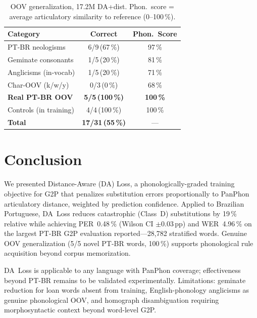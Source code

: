 \documentclass[conference]{IEEEtran}
\begin{document}
\begin{table}[t]
  \caption{OOV generalization, 17.2M DA+dist. Phon.\ score =
           average articulatory similarity to reference (0--100\,\%).}
  \label{tab:oov}
  \centering\small
  \begin{tabular}{lcc}
    \toprule
    Category & Correct & Phon.\ Score \\
    \midrule
    PT-BR neologisms        & 6/9\,(67\,\%)   & 97\,\% \\
    Geminate consonants     & 1/5\,(20\,\%)   & 81\,\% \\
    Anglicisms (in-vocab)   & 1/5\,(20\,\%)   & 71\,\% \\
    Char-OOV (k/w/y)        & 0/3\,(0\,\%)    & 68\,\% \\
    \textbf{Real PT-BR OOV} & \textbf{5/5\,(100\,\%)} & \textbf{100\,\%} \\
    Controls (in training)  & 4/4\,(100\,\%)  & 100\,\% \\
    \midrule
    \textbf{Total}          & \textbf{17/31\,(55\,\%)} & --- \\
    \bottomrule
  \end{tabular}
\end{table}

\section{Conclusion}

We presented Distance-Aware (DA) Loss, a phonologically-graded
training objective for G2P that penalizes substitution errors
proportionally to PanPhon articulatory distance, weighted by
prediction confidence.
Applied to Brazilian Portuguese, DA~Loss reduces catastrophic
(Class~D) substitutions by 19\,\% relative while achieving
PER~0.48\,\% (Wilson CI $\pm$0.03\,pp) and WER~4.96\,\% on
the largest PT-BR G2P evaluation reported---28{,}782 stratified
words.
Genuine OOV generalization (5/5 novel PT-BR words, 100\,\%)
supports phonological rule acquisition beyond corpus memorization.

DA~Loss is applicable to any language with PanPhon coverage;
effectiveness beyond PT-BR remains to be validated experimentally.
Limitations: geminate reduction for loan words absent from training,
English-phonology anglicisms as genuine phonological OOV, and
homograph disambiguation requiring morphosyntactic context beyond
word-level G2P.



\end{document}
